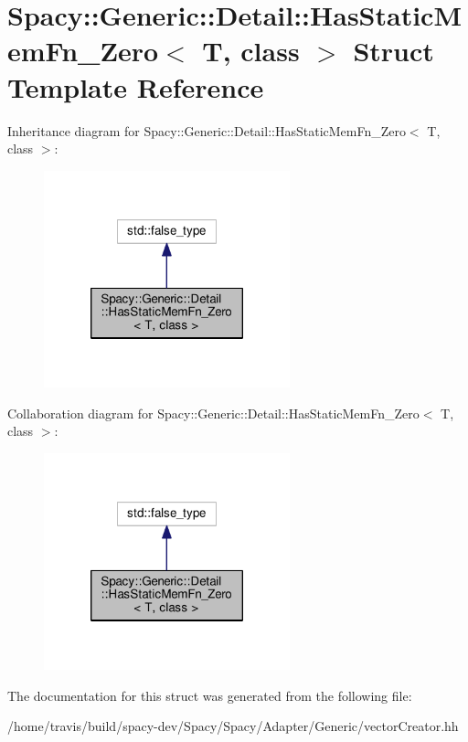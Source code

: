 \hypertarget{structSpacy_1_1Generic_1_1Detail_1_1HasStaticMemFn__Zero}{\section{Spacy\-:\-:Generic\-:\-:Detail\-:\-:Has\-Static\-Mem\-Fn\-\_\-\-Zero$<$ T, class $>$ Struct Template Reference}
\label{structSpacy_1_1Generic_1_1Detail_1_1HasStaticMemFn__Zero}
}


Inheritance diagram for Spacy\-:\-:Generic\-:\-:Detail\-:\-:Has\-Static\-Mem\-Fn\-\_\-\-Zero$<$ T, class $>$\-:
\nopagebreak
\begin{figure}[H]
\begin{center}
\leavevmode
\includegraphics[width=202pt]{structSpacy_1_1Generic_1_1Detail_1_1HasStaticMemFn__Zero__inherit__graph}
\end{center}
\end{figure}


Collaboration diagram for Spacy\-:\-:Generic\-:\-:Detail\-:\-:Has\-Static\-Mem\-Fn\-\_\-\-Zero$<$ T, class $>$\-:
\nopagebreak
\begin{figure}[H]
\begin{center}
\leavevmode
\includegraphics[width=202pt]{structSpacy_1_1Generic_1_1Detail_1_1HasStaticMemFn__Zero__coll__graph}
\end{center}
\end{figure}


The documentation for this struct was generated from the following file\-:\begin{DoxyCompactItemize}
\item 
/home/travis/build/spacy-\/dev/\-Spacy/\-Spacy/\-Adapter/\-Generic/vector\-Creator.\-hh\end{DoxyCompactItemize}

